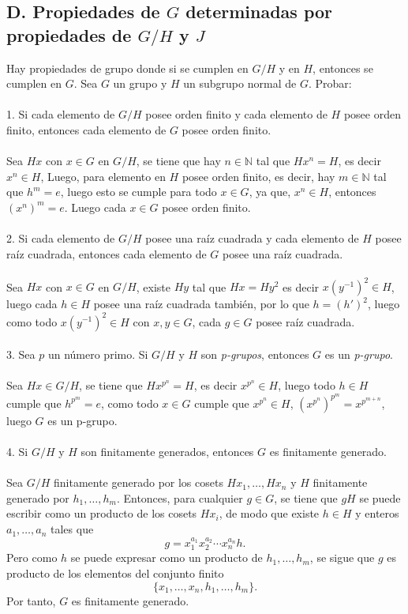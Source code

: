 \documentclass{article}
\begin{document}
\subsection*{D. Propiedades de $G$ determinadas por propiedades de $G/H$ y $J$}
Hay propiedades de grupo donde si se cumplen en $G/H$ y en $H$, entonces se cumplen en $G$. Sea $G$ un grupo y $H$ un subgrupo normal de $G$. Probar:
\\
\\
1. Si cada elemento de $G/H$ posee orden finito y cada elemento de $H$ posee orden finito, entonces cada elemento de $G$ posee orden finito.
\\
\\
Sea $Hx$ con $x \in G$ en $G/H$, se tiene que hay $n \in \mathbb{N}$ tal que $Hx^{n}=H$, es decir $x^{n} \in H$, Luego, para elemento en $H$ posee orden finito, es decir, hay $m \in \mathbb{N}$ tal que $h^{m}=e$, luego esto se cumple para todo $x \in G$, ya que, $x^{n} \in H$, entonces $(x^{n})^m=e$. Luego cada $x \in G$ posee orden finito.
\\
\\
2. Si cada elemento de $G/H$ posee una raíz cuadrada y cada elemento de $H$ posee raíz cuadrada, entonces cada elemento de $G$ posee una raíz cuadrada.
\\
\\
Sea $Hx$ con $x \in G$ en $G/H$, existe $Hy$ tal que $Hx=Hy^{2}$ es decir $x(y^{-1})^{2} \in H$, luego cada $h \in H$ posee una raíz cuadrada también, por lo que $h=(h')^{2}$, luego como todo $x(y^{-1})^{2} \in H$ con $x,y \in G$, cada $g \in G$ posee raíz cuadrada.
\\
\\
3. Sea $p$ un número primo. Si $G/H$ y $H$ son \textit{p-grupos}, entonces $G$ es un \textit{p-grupo}.
\\
\\
Sea $Hx \in G/H$, se tiene que $Hx^{p^{n}}=H$, es decir $x^{p^{n}} \in H$, luego todo $h \in H$ cumple que $h^{p^{m}}=e$, como todo $x \in G$ cumple que $x^{p^{n}} \in H$, $(x^{p^{n}})^{p^{m}} = x^{p^{m+n}}$, luego $G$ es un p-grupo.
\\
\\
4. Si $G/H$ y $H$ son finitamente generados, entonces $G$ es finitamente generado.
\\
\\
Sea \( G/H \) finitamente generado por los cosets \( Hx_1, \dots, Hx_n \) y \( H \) finitamente generado por \( h_1, \dots, h_m \). Entonces, para cualquier \( g \in G \), se tiene que \( gH \) se puede escribir como un producto de los cosets \( Hx_i \), de modo que existe \( h \in H \) y enteros \( a_1, \dots, a_n \) tales que
\[
g = x_1^{a_1} x_2^{a_2} \cdots x_n^{a_n} h.
\]
Pero como \( h \) se puede expresar como un producto de \( h_1, \dots, h_m \), se sigue que \( g \) es producto de los elementos del conjunto finito 
\[
\{x_1, \dots, x_n, h_1, \dots, h_m\}.
\]
Por tanto, \( G \) es finitamente generado.
\end{document}
